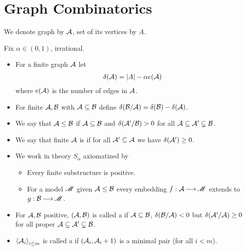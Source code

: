 
\section{Graph Combinatorics}

We denote graph by $\mathcal A$, set of its vertices by $A$.
\begin{Definition}
  Fix $\alpha \in (0,1)$, irrational.
  \begin{itemize}
  \item For a finite graph $\mathcal A$ let
    \begin{align*}
      \delta(\mathcal A) = |A| - \alpha e(\mathcal A)
    \end{align*}
    where $e(\mathcal A)$ is the number of edges in $\mathcal A$.

  \item For finite $\mathcal A,\mathcal B$ with $\mathcal A \subseteq \mathcal B$ define $\delta(\mathcal B/\mathcal A) = \delta(\mathcal B) - \delta(\mathcal A)$.
  \item We say that $\mathcal A \leq \mathcal B$ if $\mathcal A \subseteq \mathcal B$ and $\delta(\mathcal A'/\mathcal B) > 0$ for all $\mathcal A \subseteq \mathcal A' \subsetneq \mathcal B$.

  \item We say that finite $\mathcal A$ is  if for all $\mathcal A' \subseteq \mathcal A$ we have $\delta(\mathcal A') \geq 0$.

  \item We work in theory $S_\alpha$ axiomatized by
    \begin{itemize}
    \item Every finite substructure is positive.
    \item For a model $\mathscr M$ given $\mathcal A \leq \mathcal B$ every embedding $f : \mathcal A \operatorname{\longrightarrow} \mathscr M$ extends to $g: \mathcal B \operatorname{\longrightarrow} \mathscr M$.
    \end{itemize}

  \item For $\mathcal A, \mathcal B$ positive, $(\mathcal A, \mathcal B)$ is called a  if
    $\mathcal A \subseteq \mathcal B$, $\delta(\mathcal B/\mathcal A) < 0$ but $\delta(\mathcal A'/\mathcal A) \geq 0$ for all proper $\mathcal A \subseteq \mathcal A' \subsetneq \mathcal B$.

  \item $\left\langle \mathcal A_i \right\rangle_{i \leq m}$ is called a  if $(\mathcal A_i, \mathcal A_i+1)$ is a minimal pair (for all $i < m$).


\end{itemize}
\end{Definition}
